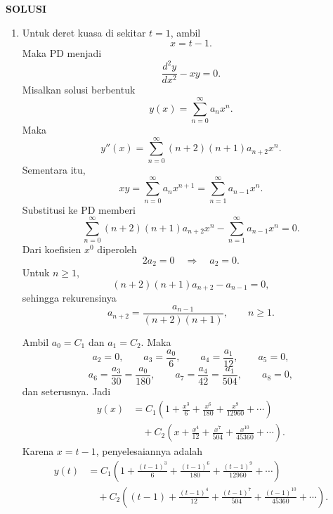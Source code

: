 \documentclass[11pt,letterpaper]{article}
\begin{document}
\begin{center}
  \textbf{SOLUSI}
\end{center}

\begin{enumerate}[leftmargin=*, itemsep=0.45cm]
  \item Untuk deret kuasa di sekitar $t=1$, ambil
        \[
          x=t-1.
        \]
        Maka PD menjadi
        \[
          \frac{d^2y}{dx^2}-xy=0.
        \]
        Misalkan solusi berbentuk
        \[
          y(x)=\sum_{n=0}^{\infty} a_nx^n.
        \]
        Maka
        \[
          y''(x)=\sum_{n=0}^{\infty}(n+2)(n+1)a_{n+2}x^n.
        \]
        Sementara itu,
        \[
          xy=\sum_{n=0}^{\infty}a_nx^{n+1}
          =\sum_{n=1}^{\infty}a_{n-1}x^n.
        \]
        Substitusi ke PD memberi
        \[
          \sum_{n=0}^{\infty}(n+2)(n+1)a_{n+2}x^n
          -
          \sum_{n=1}^{\infty}a_{n-1}x^n
          =0.
        \]
        Dari koefisien $x^0$ diperoleh
        \[
          2a_2=0 \quad \Longrightarrow \quad a_2=0.
        \]
        Untuk $n\ge 1$,
        \[
          (n+2)(n+1)a_{n+2}-a_{n-1}=0,
        \]
        sehingga rekurensinya
        \[
          a_{n+2}=\frac{a_{n-1}}{(n+2)(n+1)},\qquad n\ge 1.
        \]

        Ambil $a_0=C_1$ dan $a_1=C_2$. Maka
        \[
          a_2=0,\qquad
          a_3=\frac{a_0}{6},\qquad
          a_4=\frac{a_1}{12},\qquad
          a_5=0,
        \]
        \[
          a_6=\frac{a_3}{30}=\frac{a_0}{180},\qquad
          a_7=\frac{a_4}{42}=\frac{a_1}{504},\qquad
          a_8=0,
        \]
        dan seterusnya. Jadi
        \begin{align*}
          y(x)
           & =C_1\left(1+\frac{x^3}{6}+\frac{x^6}{180}+\frac{x^9}{12960}+\cdots\right)            \\
           & \quad +C_2\left(x+\frac{x^4}{12}+\frac{x^7}{504}+\frac{x^{10}}{45360}+\cdots\right).
        \end{align*}
        Karena $x=t-1$, penyelesaiannya adalah
        \begin{align*}
          y(t)
           & =C_1\left(1+\frac{(t-1)^3}{6}+\frac{(t-1)^6}{180}+\frac{(t-1)^9}{12960}+\cdots\right)                \\
           & \quad +C_2\left((t-1)+\frac{(t-1)^4}{12}+\frac{(t-1)^7}{504}+\frac{(t-1)^{10}}{45360}+\cdots\right).
        \end{align*}


\end{enumerate}
\end{document}
